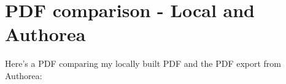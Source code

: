 \section{PDF comparison - Local and Authorea}
\label{sec:compare}

Here's a PDF comparing my locally built PDF and the PDF export from Authorea: